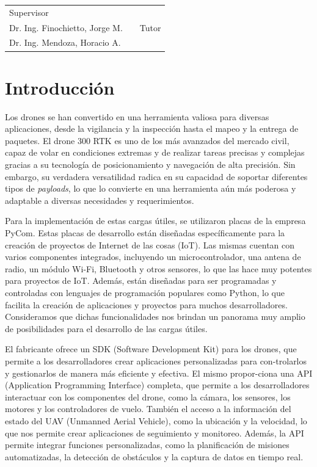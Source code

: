 \documentclass[12pt]{article}
\begin{document}
\vspace{1.5cm}

\begin{tabular}{p{5.5cm}cp{5.5cm}}
  \cline{1-1} \cline{3-3} \\
  \centering Supervisor   \\ Dr. Ing. Finochietto, Jorge M. && \centering Tutor \\ Dr. Ing. Mendoza, Horacio A.
\end{tabular}

\setlength\parindent{24pt}
\newpage
\section{Introducción}

Los drones se han convertido en una herramienta valiosa para diversas aplicaciones, desde la vigilancia y la inspección hasta el mapeo y la entrega de paquetes. El drone 300 RTK es uno de los más avanzados del mercado civil, capaz de volar en condiciones extremas y de realizar tareas precisas y complejas gracias a su tecnología de posicionamiento y navegación de alta precisión. Sin embargo, su verdadera versatilidad radica en su capacidad de soportar diferentes tipos de \textit{payloads}, lo que lo convierte en una herramienta aún más poderosa y adaptable a diversas necesidades y requerimientos.

Para la implementación de estas cargas útiles, se utilizaron placas de la empresa PyCom. Estas placas de desarrollo están diseñadas específicamente para la creación de proyectos de Internet de las cosas (IoT). Las mismas cuentan con varios componentes integrados, incluyendo un microcontrolador, una antena de radio, un módulo Wi-Fi, Bluetooth y otros sensores, lo que las hace muy potentes para proyectos de IoT. Además, están diseñadas para ser programadas y controladas con lenguajes de programación populares como Python, lo que facilita la creación de aplicaciones y proyectos para muchos desarrolladores. Consideramos que dichas funcionalidades nos brindan un panorama muy amplio de posibilidades para el desarrollo de las cargas útiles.

El fabricante ofrece un SDK (Software Development Kit) para los drones, que permite a los desarrolladores crear aplicaciones personalizadas para con-trolarlos y gestionarlos de manera más eficiente y efectiva. El mismo propor-ciona una API (Application Programming Interface) completa, que permite a los desarrolladores interactuar con los componentes del drone, como la cámara, los sensores, los motores y los controladores de vuelo. También el acceso a la información del estado del UAV (Unmanned Aerial Vehicle), como la ubicación y la velocidad, lo que nos permite crear aplicaciones de seguimiento y monitoreo. Además, la API permite integrar funciones personalizadas, como la planificación de misiones automatizadas, la detección de obstáculos y la captura de datos en tiempo real.
\end{document}
